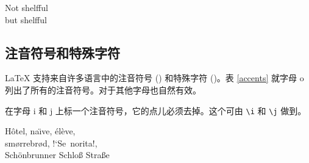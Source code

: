 \begin{example}
Not shelfful\\
but shelf\mbox{}ful
\end{example}

\subsection{注音符号和特殊字符}

\LaTeX{} 支持来自许多语言中的注音符号 () 和特殊字符 ()。表 \ref{accents} 
就字母 o 列出了所有的注音符号。对于其他字母也自然有效。

在字母 i 和 j 上标一个注音符号，它的点儿必须去掉。这个可由 \verb|\i| 和 \verb|\j| 做到。

\begin{example}
H\^otel, na\"\i ve, \'el\`eve,\\
sm\o rrebr\o d, !`Se\ norita!,\\
Sch\"onbrunner Schlo\ss{}
Stra\ss e
\end{example}

